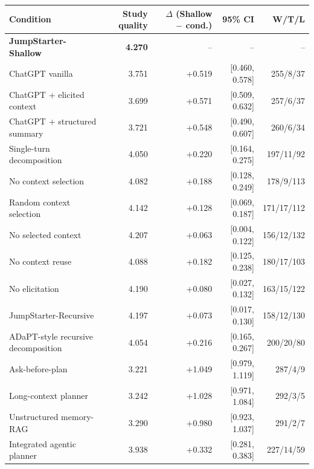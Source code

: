 \begin{tabular}{lrrrr}
\toprule
Condition & Study quality & $\Delta$ (Shallow $-$ cond.) & 95\% CI & W/T/L \\
\midrule
\textbf{JumpStarter-Shallow} & \textbf{4.270} & -- & -- & -- \\
\midrule
ChatGPT vanilla & 3.751 & +0.519 & [0.460, 0.578] & 255/8/37 \\
ChatGPT + elicited context & 3.699 & +0.571 & [0.509, 0.632] & 257/6/37 \\
ChatGPT + structured summary & 3.721 & +0.548 & [0.490, 0.607] & 260/6/34 \\
Single-turn decomposition & 4.050 & +0.220 & [0.164, 0.275] & 197/11/92 \\
No context selection & 4.082 & +0.188 & [0.128, 0.249] & 178/9/113 \\
Random context selection & 4.142 & +0.128 & [0.069, 0.187] & 171/17/112 \\
No selected context & 4.207 & +0.063 & [0.004, 0.122] & 156/12/132 \\
No context reuse & 4.088 & +0.182 & [0.125, 0.238] & 180/17/103 \\
No elicitation & 4.190 & +0.080 & [0.027, 0.132] & 163/15/122 \\
JumpStarter-Recursive & 4.197 & +0.073 & [0.017, 0.130] & 158/12/130 \\
ADaPT-style recursive decomposition & 4.054 & +0.216 & [0.165, 0.267] & 200/20/80 \\
Ask-before-plan & 3.221 & +1.049 & [0.979, 1.119] & 287/4/9 \\
Long-context planner & 3.242 & +1.028 & [0.971, 1.084] & 292/3/5 \\
Unstructured memory-RAG & 3.290 & +0.980 & [0.923, 1.037] & 291/2/7 \\
Integrated agentic planner & 3.938 & +0.332 & [0.281, 0.383] & 227/14/59 \\
\bottomrule
\end{tabular}
